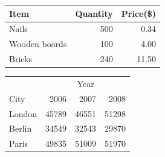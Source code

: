 \documentclass{article}
\begin{document}
\begin{tabular}{l|r|r}
Item          & Quantity & Price(\$) \\
\hline
Nails         & 500      & 0.34      \\
Wooden boards & 100      & 4.00      \\
Bricks        & 240      & 11.50     \\
\end{tabular}

\vspace{1cm}

\begin{tabular}{l|rrr}
      & \multicolumn{3}{c}{Year} \\
City  & 2006  & 2007  & 2008  \\
\hline
London & 45789 & 46551 & 51298 \\
Berlin & 34549 & 32543 & 29870 \\
Paris  & 49835 & 51009 & 51970 \\
\end{tabular}
\end{document}
